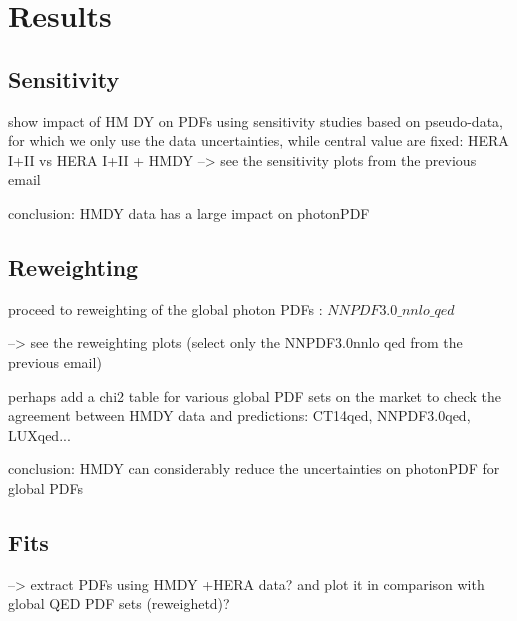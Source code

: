 \section{Results}

\subsection{Sensitivity}
 show impact of HM DY on PDFs using sensitivity studies based on
pseudo-data, for which we only use the data uncertainties, while central 
value are fixed:
 HERA I+II vs HERA I+II + HMDY --> see the sensitivity plots from the previous email


conclusion: HMDY data has a large impact on photonPDF 

\subsection{Reweighting}

proceed to reweighting of the global photon PDFs : $NNPDF3.0\_nnlo\_qed$

-->  see the reweighting plots (select only the NNPDF3.0nnlo qed from the previous email)

perhaps add a chi2 table for various global PDF sets on the market to check the 
agreement between HMDY data and predictions: CT14qed, NNPDF3.0qed, LUXqed...

conclusion: HMDY can considerably reduce the uncertainties on photonPDF for global PDFs

\subsection{Fits}

--> extract PDFs using HMDY +HERA data? and plot it in comparison with global QED PDF sets (reweighetd)?



